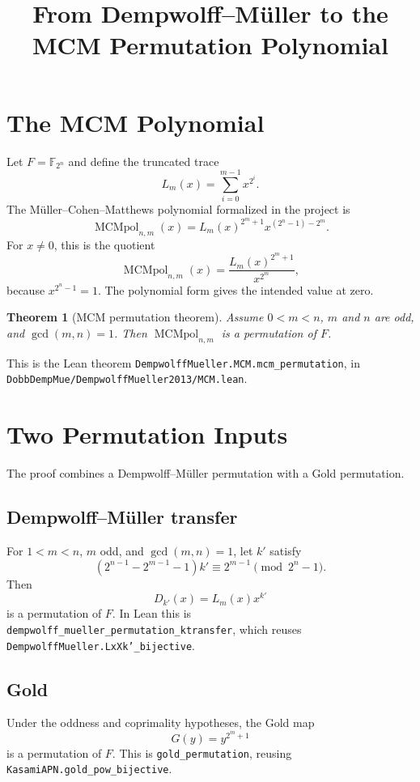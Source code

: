 \documentclass[11pt]{article}
\title{From Dempwolff--M\"uller to the MCM Permutation Polynomial}
\author{}
\date{}
\newtheorem{theorem}{Theorem}
\newcommand{\F}{\mathbb{F}}
\newcommand{\MCM}{\operatorname{MCMpol}}
\newcommand{\Trunc}{L}
\begin{document}
\maketitle

\section{The MCM Polynomial}

Let $F=\F_{2^n}$ and define the truncated trace
\[
  \Trunc_m(x)=\sum_{i=0}^{m-1}x^{2^i}.
\]
The M\"uller--Cohen--Matthews polynomial formalized in the project is
\[
  \MCM_{n,m}(x)=\Trunc_m(x)^{2^m+1}x^{(2^n-1)-2^m}.
\]
For $x\ne0$, this is the quotient
\[
  \MCM_{n,m}(x)=\frac{\Trunc_m(x)^{2^m+1}}{x^{2^m}},
\]
because $x^{2^n-1}=1$.  The polynomial form gives the intended value at zero.

\begin{theorem}[MCM permutation theorem]
Assume $0<m<n$, $m$ and $n$ are odd, and $\gcd(m,n)=1$.  Then
$\MCM_{n,m}$ is a permutation of $F$.
\end{theorem}

This is the Lean theorem \texttt{DempwolffMueller.MCM.mcm\_permutation}, in
\texttt{DobbDempMue/DempwolffMueller2013/MCM.lean}.

\section{Two Permutation Inputs}

The proof combines a Dempwolff--M\"uller permutation with a Gold permutation.

\subsection{Dempwolff--M\"uller transfer}

For $1<m<n$, $m$ odd, and $\gcd(m,n)=1$, let $k'$ satisfy
\[
  (2^{n-1}-2^{m-1}-1)k'\equiv2^{m-1}\pmod{2^n-1}.
  \tag{DM}
\]
Then
\[
  D_{k'}(x)=\Trunc_m(x)x^{k'}
\]
is a permutation of $F$.  In Lean this is
\texttt{dempwolff\_mueller\_permutation\_ktransfer}, which reuses
\texttt{DempwolffMueller.LxXk'\_bijective}.

\subsection{Gold}

Under the oddness and coprimality hypotheses, the Gold map
\[
  G(y)=y^{2^m+1}
\]
is a permutation of $F$.  This is \texttt{gold\_permutation}, reusing
\texttt{KasamiAPN.gold\_pow\_bijective}.
\end{document}
